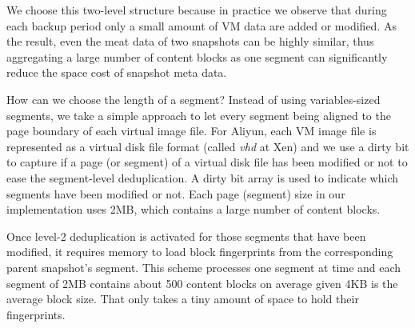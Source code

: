We choose this two-level structure because in practice we observe that during each backup period only a small amount
of VM data are added or modified. As the result, even the meat data of two snapshots can be highly similar,
thus aggregating a large number of content blocks as one segment can significantly
reduce the space cost of snapshot meta data. 

How can we choose the length of a segment?
Instead of using variables-sized segments, we take a simple approach
to let every segment being aligned to the page boundary of each virtual image file.
For Aliyun, each VM image file is represented as a virtual disk file format
(called \emph{vhd} at Xen) and we use a dirty bit to capture if a page (or segment) of a virtual disk file 
has been modified or not to ease the segment-level deduplication.
A dirty bit array is used to indicate which segments have been modified or not. 
Each page (segment) size in our implementation uses 2MB, which contains a large number of content blocks.






Once level-2 deduplication is activated for those segments that have been modified,
it requires memory to load  block fingerprints from the corresponding
parent snapshot's segment.
This scheme processes one segment at time and each segment of 2MB contains about 
500 content blocks on average given 4KB is the average block size.
That only takes a tiny amount of space to hold their fingerprints.


